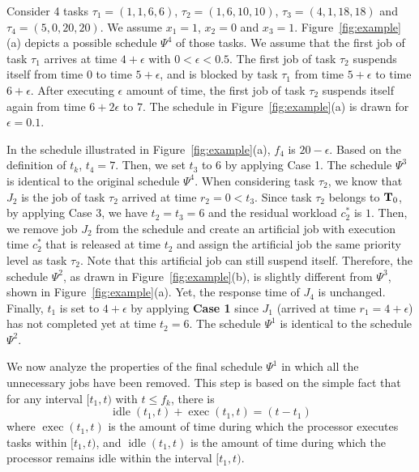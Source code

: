 \begin{example}
\label{ex:proof_step1}
Consider 4 tasks $\tau_1 =(1,1,6,6)$, $\tau_2 =(1,6,10,10)$, $\tau_3 =(4,1,18,18)$ and $\tau_4 =(5,0,20,20)$.
We assume $x_1=1$, $x_2=0$ and $x_3=1$.
Figure~\ref{fig:example}(a) depicts a possible schedule $\Psi^4$ of those tasks. We assume that the first job of task $\tau_1$ arrives
at time $4+\epsilon$ with $0 < \epsilon < 0.5$. The first job
of task $\tau_2$ suspends itself from time $0$ to time $5+\epsilon$,
and is blocked by task $\tau_1$ from time $5+\epsilon$ to time
$6+\epsilon$. After executing $\epsilon$ amount
of time, the first job of task $\tau_2$ suspends itself again from
time $6+2\epsilon$ to $7$. The schedule in Figure~\ref{fig:example}(a) is drawn for $\epsilon=0.1$.
   
In the schedule illustrated in Figure~\ref{fig:example}(a), $f_4$ is
$20-\epsilon$.  Based on the definition of $t_k$, $t_4=7$. Then, we set $t_3$ to $6$ by applying Case 1. The
schedule $\Psi^3$ is identical to the original schedule $\Psi^4$. When considering task $\tau_2$, we know that $J_2$ is the job of task
$\tau_2$ arrived at time $r_2 = 0 < t_3$. Since task $\tau_2$ belongs to ${\bf
  T}_0$, by applying Case 3, we have $t_2=t_3=6$ and the
residual workload $c_2^*$ is $1$. Then, we remove job $J_2$ from the
schedule and create an artificial job with execution time $c_2^*$ that
is released at time $t_2$ and assign the artificial job the same priority level as task
$\tau_2$. Note that this artificial job can still suspend itself. Therefore, the schedule $\Psi^2$, as drawn in 
Figure~\ref{fig:example}(b), is slightly different from $\Psi^3$, shown in Figure~\ref{fig:example}(a). Yet, the response time of $J_4$ is unchanged. Finally, $t_1$ is set to $4+\epsilon$ by applying {\bf Case 1} since
$J_1$ (arrived at time $r_1=4+\epsilon$) has not completed yet at time
$t_2=6$.  The schedule $\Psi^1$ is identical to the schedule
$\Psi^2$.
\myendproof
\end{example}


We now analyze the properties of the final schedule $\Psi^1$ in which
all the unnecessary jobs have been removed. %
This step is based on the simple fact that for any interval $[t_1, t)$ with $t \leq f_k$, there is 
\begin{equation}
\label{eq:exec_plus_idle}
\operatorname{idle}(t_1, t) + \operatorname{exec}(t_1, t)  = (t - t_1)
\end{equation}
where $\operatorname{exec}(t_1, t)$ is the amount of time during which the processor executes tasks within $[t_1, t)$, and $\operatorname{idle}(t_1, t)$ is the amount of time during which the processor remains idle within the interval $[t_1, t)$.

